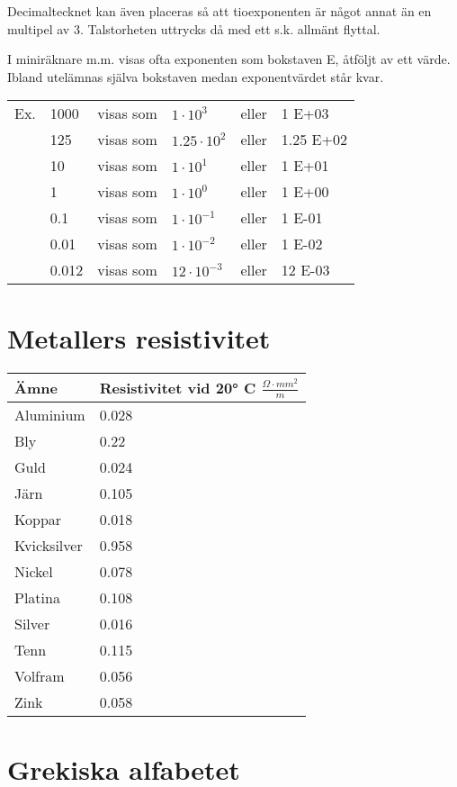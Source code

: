 Decimaltecknet kan även placeras så att tioexponenten är något annat
än en multipel av 3. Talstorheten uttrycks då med ett s.k. allmänt
flyttal.

I miniräknare m.m. visas ofta exponenten som bokstaven E, åtföljt av
ett värde. Ibland utelämnas själva bokstaven medan exponentvärdet står
kvar.

\begin{tabular}{llllll}
  Ex. & 1000  & visas som & \(1    \cdot 10^3  \) & eller & 1 E+03 \\
      & 125   & visas som & \(1.25 \cdot 10^2  \) & eller & 1.25 E+02 \\
      & 10    & visas som & \(1    \cdot 10^1  \) & eller & 1 E+01 \\
      & 1     & visas som & \(1    \cdot 10^0  \) & eller & 1 E+00 \\
      & 0.1   & visas som & \(1    \cdot 10^{-1}\) & eller & 1 E-01 \\
      & 0.01  & visas som & \(1    \cdot 10^{-2}\) & eller & 1 E-02 \\
      & 0.012 & visas som & \(12   \cdot 10^{-3}\) & eller & 12 E-03 \\
\end{tabular}

\section{Metallers resistivitet}

\begin{tabular}{l|l}
  Ämne & Resistivitet vid 20° C \(\frac{Ω\cdot mm^2}{m}\) \\
  \hline
  Aluminium   & 0.028 \\
  Bly         & 0.22  \\
  Guld        & 0.024 \\
  Järn        & 0.105 \\
  Koppar      & 0.018 \\
  Kvicksilver & 0.958 \\
  Nickel      & 0.078 \\
  Platina     & 0.108 \\
  Silver      & 0.016 \\
  Tenn        & 0.115 \\
  Volfram     & 0.056 \\
  Zink        & 0.058 \\
\end{tabular}


\section{Grekiska alfabetet}


